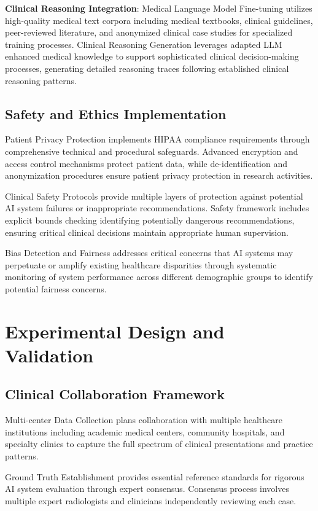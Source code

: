 \textbf{Clinical Reasoning Integration}: Medical Language Model Fine-tuning utilizes high-quality medical text corpora including medical textbooks, clinical guidelines, peer-reviewed literature, and anonymized clinical case studies for specialized training processes. Clinical Reasoning Generation leverages adapted LLM enhanced medical knowledge to support sophisticated clinical decision-making processes, generating detailed reasoning traces following established clinical reasoning patterns.

\subsection{Safety and Ethics Implementation}

Patient Privacy Protection implements HIPAA compliance requirements through comprehensive technical and procedural safeguards. Advanced encryption and access control mechanisms protect patient data, while de-identification and anonymization procedures ensure patient privacy protection in research activities.

Clinical Safety Protocols provide multiple layers of protection against potential AI system failures or inappropriate recommendations. Safety framework includes explicit bounds checking identifying potentially dangerous recommendations, ensuring critical clinical decisions maintain appropriate human supervision.

Bias Detection and Fairness addresses critical concerns that AI systems may perpetuate or amplify existing healthcare disparities through systematic monitoring of system performance across different demographic groups to identify potential fairness concerns.

\section{Experimental Design and Validation}

\subsection{Clinical Collaboration Framework}

Multi-center Data Collection plans collaboration with multiple healthcare institutions including academic medical centers, community hospitals, and specialty clinics to capture the full spectrum of clinical presentations and practice patterns.

Ground Truth Establishment provides essential reference standards for rigorous AI system evaluation through expert consensus. Consensus process involves multiple expert radiologists and clinicians independently reviewing each case.

